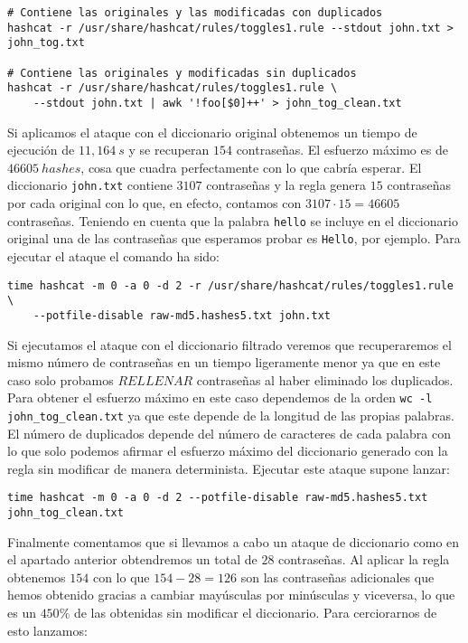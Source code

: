 \documentclass{article}
\begin{document}
            \begin{verbatim}
# Contiene las originales y las modificadas con duplicados
hashcat -r /usr/share/hashcat/rules/toggles1.rule --stdout john.txt > john_tog.txt

# Contiene las originales y modificadas sin duplicados
hashcat -r /usr/share/hashcat/rules/toggles1.rule \
    --stdout john.txt | awk '!foo[$0]++' > john_tog_clean.txt
            \end{verbatim}

            Si aplicamos el ataque con el diccionario original obtenemos un tiempo de ejecución de $11,164\ s$ y se recuperan $154$ contraseñas. El esfuerzo máximo es de $46605\ hashes$, cosa que cuadra perfectamente con lo que cabría esperar. El diccionario \texttt{john.txt} contiene $3107$ contraseñas y la regla genera $15$ contraseñas por cada original con lo que, en efecto, contamos con $3107 \cdot 15 = 46605$ contraseñas. Teniendo en cuenta que la palabra \texttt{hello} se incluye en el diccionario original una de las contraseñas que esperamos probar es \texttt{Hello}, por ejemplo. Para ejecutar el ataque el comando ha sido:


            \begin{verbatim}
time hashcat -m 0 -a 0 -d 2 -r /usr/share/hashcat/rules/toggles1.rule \
    --potfile-disable raw-md5.hashes5.txt john.txt
            \end{verbatim}

            Si ejecutamos el ataque con el diccionario filtrado veremos que recuperaremos el mismo número de contraseñas en un tiempo ligeramente menor ya que en este caso solo probamos $RELLENAR$ contraseñas al haber eliminado los duplicados. Para obtener el esfuerzo máximo en este caso dependemos de la orden \texttt{wc -l john\_tog\_clean.txt} ya que este depende de la longitud de las propias palabras. El número de duplicados depende del número de caracteres de cada palabra con lo que solo podemos afirmar el esfuerzo máximo del diccionario generado con la regla sin modificar de manera determinista. Ejecutar este ataque supone lanzar:

            \begin{verbatim}
time hashcat -m 0 -a 0 -d 2 --potfile-disable raw-md5.hashes5.txt john_tog_clean.txt
            \end{verbatim}

            Finalmente comentamos que si llevamos a cabo un ataque de diccionario como en el apartado anterior obtendremos un total de $28$ contraseñas. Al aplicar la regla obtenemos $154$ con lo que $154 - 28 = 126$ son las contraseñas adicionales que hemos obtenido gracias a cambiar mayúsculas por minúsculas y viceversa, lo que es un $450\%$ de las obtenidas sin modificar el diccionario. Para cerciorarnos de esto lanzamos:
            
\end{document}
